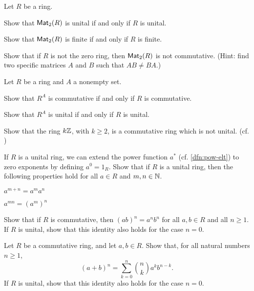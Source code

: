 \begin{exercise}
Let \(R\) be a ring.
\begin{proplist}
\item Show that \(\mathsf{Mat}_{2}(R)\) is unital if and only if \(R\) is unital.
\item Show that \(\mathsf{Mat}_{2}(R)\) is finite if and only if \(R\) is finite.
\item Show that if \(R\) is not the zero ring, then \(\mathsf{Mat}_{2}(R)\) is not commutative. (Hint: find two specific matrices \(A\) and \(B\) such that \(AB \neq BA\).)
\end{proplist}
\end{exercise}

\begin{exercise}
Let \(R\) be a ring and \(A\) a nonempty set.
\begin{proplist}
\item Show that \(R^A\) is commutative if and only if \(R\) is commutative.
\item Show that \(R^A\) is unital if and only if \(R\) is unital.
\end{proplist}
\end{exercise}

\begin{exercise}
Show that the ring \(k\mathbb{Z}\), with \(k \geq 2\), is a commutative ring which is not unital. (cf. )
\end{exercise}

\begin{exercise}
If \(R\) is a unital ring, we can extend the power function \(a^\ast\) (cf. \ref{dfn:pow-elt}) to zero exponents by defining \(a^0 = 1_R\). Show that if \(R\) is a unital ring, then the following properties hold for all \(a \in R\) and \(m,n \in \mathbb{N}\).
\begin{proplist*}
\item \(a^{m+n} = a^m a^n\)
\item \(a^{mn} = (a^m)^n\)
\end{proplist*}
\end{exercise}

\begin{exercise}
Show that if \(R\) is commutative, then \((ab)^n = a^n b^n\) for all \(a,b \in R\) and all \(n \geq 1\). If \(R\) is unital, show that this identity also holds for the case \(n = 0\).
\end{exercise}

\begin{exercise}
Let \(R\) be a commutative ring, and let \(a,b \in R\). Show that, for all natural numbers \(n \geq 1\), \[ (a+b)^n = \sum_{k=0}^n {n \choose k} a^k b^{n-k}. \] If \(R\) is unital, show that this identity also holds for the case \(n = 0\).
\end{exercise}

